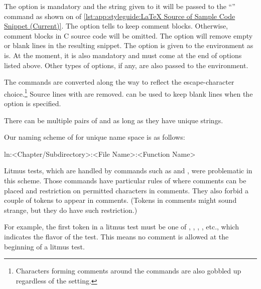 The  option is mandatory and the string given to it
will be passed to the
``'' command as shown on
 of
\cref{lst:app:styleguide:LaTeX Source of Sample Code Snippet (Current)}.
The  option tells  to keep
comment blocks.
Otherwise, comment blocks in C source code will be omitted.
The  option will remove empty or blank lines
in the resulting snippet.
The  option is given to the  environment
as is.
At the moment, it is also mandatory and must come at the end of options
listed above.
Other types of options, if any, are also passed to the 
environment.

The \qco{\\lnlbl} commands are converted along the way to reflect
the escape-character choice.\footnote{
	Characters forming comments around the \qco{\\lnlbl} commands
	are also gobbled up regardless of the  setting.
}
Source lines with \qco{\\fcvexclude} are removed.
\qco{\\fcvblank} can be used to keep blank lines when the
 option is specified.

There can be multiple pairs of  and 
as long as they have unique  strings.

Our naming scheme of  for unique name space is as follows:

\begin{VerbatimU}
ln:<Chapter/Subdirectory>:<File Name>:<Function Name>
\end{VerbatimU}

Litmus tests, which are handled by  commands such as
 and , were problematic in this scheme.
Those commands have particular rules of where comments can be
placed and restriction on permitted characters in comments.
They also forbid a couple of tokens to appear in comments.
(Tokens in comments might sound strange, but they do have such restriction.)

For example, the first token in a litmus test must be one of
, , , , etc., which indicates
the flavor of the test.
This means no comment is allowed at the beginning of a litmus test.


